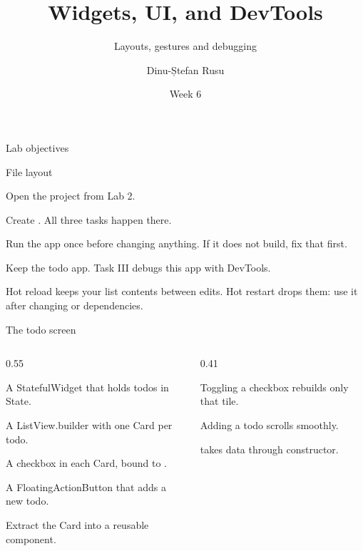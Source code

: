 \documentclass[10pt,aspectratio=169,t]{beamer}
\title{Widgets, UI, and DevTools}
\subtitle{Layouts, gestures and debugging}
\author{Dinu-Ștefan Rusu}
\date{Week 6}
\begin{document}
\titleframe

\begin{frame}[eyebrow=Today]{Lab objectives}
  \vskip 2mm
  \begin{grid}[2]
  \end{grid}
  \vskip 6mm
\end{frame}

\begin{frame}[fragile,eyebrow=Setup]{File layout}
  \begin{steps}
    \item Open the project from Lab 2.
    \item Create . All three tasks happen there.
    \item Run the app once before changing anything. If it does not build, fix that first.
    \item Keep the todo app. Task III debugs this app with DevTools.
  \end{steps}
  \begin{hint}
    Hot reload keeps your list contents between edits. Hot restart drops them: use it after changing  or dependencies.
  \end{hint}
\end{frame}

\begin{frame}[eyebrow=Task I]{The todo screen}
  \begin{columns}[T]
    \begin{column}{0.55\textwidth}
      \begin{steps}
        \item A StatefulWidget that holds todos in State.
        \item A ListView.builder with one Card per todo.
        \item A checkbox in each Card, bound to .
        \item A FloatingActionButton that adds a new todo.
        \item Extract the Card into a reusable  component.
      \end{steps}
    \end{column}
    \begin{column}{0.41\textwidth}
      \begin{checklist}
        \item Toggling a checkbox rebuilds only that tile.
        \item Adding a todo scrolls smoothly.
        \item {} takes data through constructor.
      \end{checklist}
    \end{column}
  \end{columns}
\end{frame}
\end{document}
